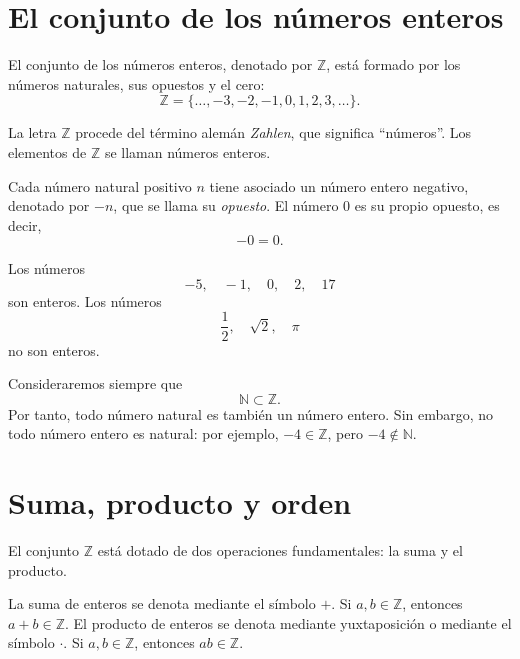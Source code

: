 \section{El conjunto de los números enteros}

\begin{definicion}
El conjunto de los números enteros, denotado por \(\mathbb{Z}\), está formado por los números naturales, sus opuestos y el cero:
\[
  \mathbb{Z}=\{\ldots,-3,-2,-1,0,1,2,3,\ldots\}.
\]
\end{definicion}

La letra \(\mathbb{Z}\) procede del término alemán \emph{Zahlen}, que significa ``números''. Los elementos de \(\mathbb{Z}\) se llaman números enteros.

Cada número natural positivo \(n\) tiene asociado un número entero negativo, denotado por \(-n\), que se llama su \emph{opuesto}. El número \(0\) es su propio opuesto, es decir,
\[
  -0=0.
\]

\begin{ejemplo}
Los números
\[
  -5,\quad -1,\quad 0,\quad 2,\quad 17
\]
son enteros. Los números
\[
  \frac{1}{2},\quad \sqrt{2},\quad \pi
\]
no son enteros.
\end{ejemplo}

\begin{convencion}
Consideraremos siempre que
\[
  \mathbb{N}\subset \mathbb{Z}.
\]
Por tanto, todo número natural es también un número entero. Sin embargo, no todo número entero es natural: por ejemplo, \(-4\in\mathbb{Z}\), pero \(-4\notin\mathbb{N}\).
\end{convencion}

\section{Suma, producto y orden}

El conjunto \(\mathbb{Z}\) está dotado de dos operaciones fundamentales: la suma y el producto.

La suma de enteros se denota mediante el símbolo \(+\). Si \(a,b\in\mathbb{Z}\), entonces \(a+b\in\mathbb{Z}\). El producto de enteros se denota mediante yuxtaposición o mediante el símbolo \(\cdot\). Si \(a,b\in\mathbb{Z}\), entonces \(ab\in\mathbb{Z}\).

